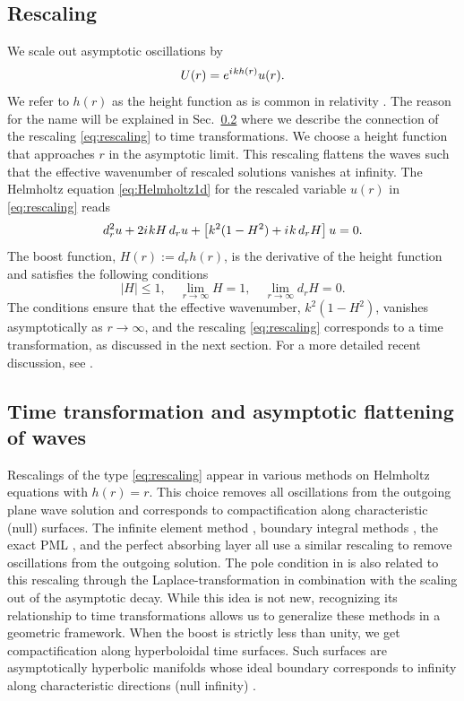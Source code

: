 \documentclass[onefignum,onetabnum]{siamart190516}
\newcommand{\be}{\begin{equation}}
\newcommand{\ee}{\end{equation}}
\newcommand{\iu}{{i\mkern1mu}}
\begin{document}
\subsection{Rescaling}
We scale out asymptotic oscillations by
\be\label{eq:rescaling} U(r) = e^{\iu k h(r)} u(r).\ee
We refer to $h(r)$ as the height function as is common in relativity \cite{reinhart1973maximal, beig1996vacuum}. The reason for the name will be explained in Sec.~\ref{sec:tt} where we describe the connection of the rescaling \eqref{eq:rescaling} to time transformations. We  choose a height function that approaches $r$ in the asymptotic limit. This rescaling flattens the waves such that the effective wavenumber of rescaled solutions vanishes at infinity. The Helmholtz equation \eqref{eq:Helmholtz1d} for the rescaled variable $u(r)$ in \eqref{eq:rescaling} reads
\be\label{eq:resc_helm}
d_r^2 u + 2 \iu k H \, d_r u + \left[ k^2 (1-H^2) + \iu k\, d_r H\right] u = 0.
\ee
The boost function, $H(r) :=d_r h(r)$, is the derivative of the height function and satisfies the following conditions \cite{Zenginoglu08, ZengFramework, jaramillo2021pseudospectrum}
\be \label{eq:h_cond}
	|H| \leq 1, \quad \lim_{r\to\infty} H = 1, \quad \lim_{r\to\infty} d_r H = 0.
\ee
The conditions ensure that the effective wavenumber, $k^2(1-H^2)$, vanishes asymptotically as $r\to\infty$, and the rescaling \eqref{eq:rescaling} corresponds to a time transformation, as discussed in the next section. For a more detailed recent discussion, see \cite{zenginouglu2024hyperbolic, zenginouglu2025bridging, panosso2024hyperboloidal}.


\subsection{Time transformation and asymptotic flattening of waves} \label{sec:tt}
Rescalings of the type \eqref{eq:rescaling} appear in various methods on Helmholtz equations with $h(r)=r$. This choice removes all oscillations from the outgoing plane wave solution and corresponds to compactification along characteristic (null) surfaces. The infinite element method \cite{demkowicz2006few, halla2016convergence, nannen2022complex}, boundary integral methods \cite{chandler2012numerical}, the exact PML \cite{hugonin2005perfectly, bermudez2008exact}, and the perfect absorbing layer \cite{wang2017perfect, yang2021truly, wang2025novel} all use a similar rescaling to remove oscillations from the outgoing solution. The pole condition in \cite{schmidt2008pole} is also related to this rescaling through the Laplace-transformation in combination with the scaling out of the asymptotic decay. While this idea is not new, recognizing its relationship to time transformations allows us to generalize these methods in a geometric framework. When the boost is strictly less than unity, we get compactification along hyperboloidal time surfaces. Such surfaces are asymptotically hyperbolic manifolds whose ideal boundary corresponds to infinity along characteristic directions (null infinity) \cite{friedrich1986, zenginouglu2024hyperbolic}.
\end{document}
